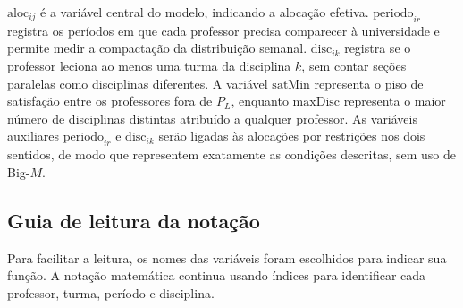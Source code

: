\documentclass[11pt,a4paper]{article}
\begin{document}
$\mathrm{aloc}_{ij}$ é a variável central do modelo, indicando a alocação efetiva. $\mathrm{periodo}_{ir}$ registra os períodos em que cada professor precisa comparecer à universidade e permite medir a compactação da distribuição semanal. $\mathrm{disc}_{ik}$ registra se o professor leciona ao menos uma turma da disciplina $k$, sem contar seções paralelas como disciplinas diferentes. A variável $\mathrm{satMin}$ representa o piso de satisfação entre os professores fora de $P_L$, enquanto $\mathrm{maxDisc}$ representa o maior número de disciplinas distintas atribuído a qualquer professor. As variáveis auxiliares $\mathrm{periodo}_{ir}$ e $\mathrm{disc}_{ik}$ serão ligadas às alocações por restrições nos dois sentidos, de modo que representem exatamente as condições descritas, sem uso de Big-$M$.

\subsection{Guia de leitura da notação}

Para facilitar a leitura, os nomes das variáveis foram escolhidos para indicar sua função. A notação matemática continua usando índices para identificar cada professor, turma, período e disciplina.
\end{document}
